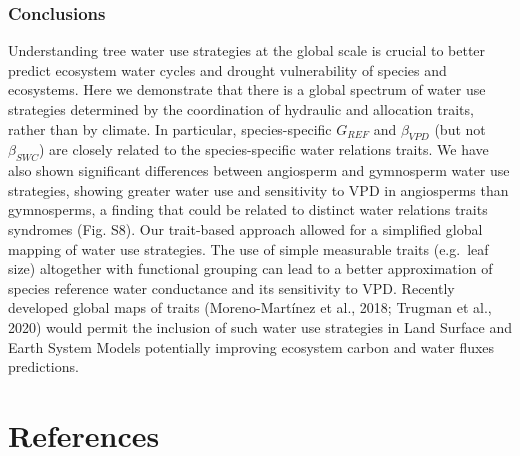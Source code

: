 \documentclass[11pt,twoside]{reedthesis}
\begin{document}
\subsection{Conclusions}\label{conclusions}

Understanding tree water use strategies at the global scale is crucial
to better predict ecosystem water cycles and drought vulnerability of
species and ecosystems. Here we demonstrate that there is a global
spectrum of water use strategies determined by the coordination of
hydraulic and allocation traits, rather than by climate. In particular,
species-specific \(G_{REF}\) and \(\beta_{VPD}\) (but not
\(\beta_{SWC}\)) are closely related to the species-specific water
relations traits. We have also shown significant differences between
angiosperm and gymnosperm water use strategies, showing greater water
use and sensitivity to VPD in angiosperms than gymnosperms, a finding
that could be related to distinct water relations traits syndromes (Fig.
S8). Our trait-based approach allowed for a simplified global mapping of
water use strategies. The use of simple measurable traits (e.g.~leaf
size) altogether with functional grouping can lead to a better
approximation of species reference water conductance and its sensitivity
to VPD. Recently developed global maps of traits (Moreno-Martínez et
al., 2018; Trugman et al., 2020) would permit the inclusion of such
water use strategies in Land Surface and Earth System Models potentially
improving ecosystem carbon and water fluxes predictions.\par

\chapter*{References}\label{references}

\setlength{\parindent}{-0.20in} \setlength{\leftskip}{0.20in}
\setlength{\parskip}{8pt}
\end{document}
